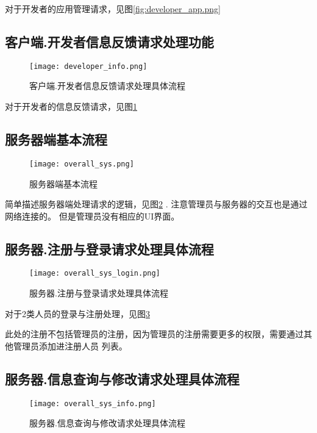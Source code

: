对于开发者的应用管理请求，见图\ref{fig:developer_app.png}

\subsection{客户端.开发者信息反馈请求处理功能}
\begin{figure}[ht]
	\centering
	\texttt{[image: developer\_info.png]}
	\caption{客户端.开发者信息反馈请求处理具体流程} \label{fig:developer_info.png}
\end{figure}

对于开发者的信息反馈请求，见图\ref{fig:developer_info.png}


\subsection{服务器端基本流程}
\begin{figure}[ht]
	\centering
	\texttt{[image: overall\_sys.png]}
	\caption{服务器端基本流程} \label{fig:overall_sys.png}
\end{figure}
简单描述服务器端处理请求的逻辑，见图\ref{fig:overall_sys.png}    .
注意管理员与服务器的交互也是通过网络连接的。
但是管理员没有相应的UI界面。


\subsection{服务器.注册与登录请求处理具体流程}
\begin{figure}[ht]
	\centering
	\texttt{[image: overall\_sys\_login.png]}
	\caption{服务器.注册与登录请求处理具体流程} \label{fig:overall_sys_login.png}
\end{figure}

对于2类人员的登录与注册处理，见图\ref{fig:overall_sys_login.png}

此处的注册不包括管理员的注册，因为管理员的注册需要更多的权限，需要通过其他管理员添加进注册人员
列表。

\subsection{服务器.信息查询与修改请求处理具体流程}
\begin{figure}[ht]
	\centering
	\texttt{[image: overall\_sys\_info.png]}
	\caption{服务器.信息查询与修改请求处理具体流程} \label{fig:overall_sys_info.png}
\end{figure}

